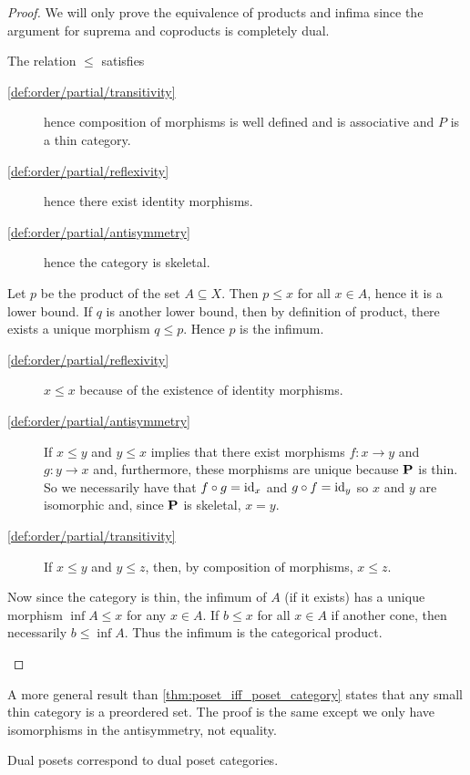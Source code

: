 \begin{proof}
  We will only prove the equivalence of products and infima since the argument for suprema and coproducts is completely dual.

  \begin{description}
    \Implies The relation $\leq$ satisfies
    \begin{description}
      \item[\ref{def:order/partial/transitivity}] hence composition of morphisms is well defined and is associative and $P$ is a thin category.
      \item[\ref{def:order/partial/reflexivity}] hence there exist identity morphisms.
      \item[\ref{def:order/partial/antisymmetry}] hence the category is skeletal.
    \end{description}

    Let $p$ be the product of the set $A \subseteq X$. Then $p \leq x$ for all $x \in A$, hence it is a lower bound. If $q$ is another lower bound, then by definition of product, there exists a unique morphism $q \leq p$. Hence $p$ is the infimum.

    \ImpliedBy\mbox{}
    \begin{description}
      \item[\ref{def:order/partial/reflexivity}] $x \leq x$ because of the existence of identity morphisms.
      \item[\ref{def:order/partial/antisymmetry}] If $x \leq y$ and $y \leq x$ implies that there exist morphisms $f: x \to y$ and $g: y \to x$ and, furthermore, these morphisms are unique because $\operatorname{\mathbf{P}}$ is thin. So we necessarily have that $f \circ g = \operatorname{id}_x$ and $g \circ f = \operatorname{id}_y$ so $x$ and $y$ are isomorphic and, since $\operatorname{\mathbf{P}}$ is skeletal, $x = y$.
      \item[\ref{def:order/partial/transitivity}] If $x \leq y$ and $y \leq z$, then, by composition of morphisms, $x \leq z$.
    \end{description}

    Now since the category is thin, the infimum of $A$ (if it exists) has a unique morphism $\inf A \leq x$ for any $x \in A$. If $b \leq x$ for all $x \in A$ if another cone, then necessarily $b \leq \inf A$. Thus the infimum is the categorical product.
  \end{description}
\end{proof}

\begin{note}\label{note:small_thin_category_isomorphic_to_preorder}
  A more general result than \cref{thm:poset_iff_poset_category} states that any small thin category is a preordered set. The proof is the same except we only have isomorphisms in the antisymmetry, not equality.
\end{note}

\begin{proposition}\label{thm:dual_poset_dual_poset_category}
  Dual posets correspond to dual poset categories.
\end{proposition}

